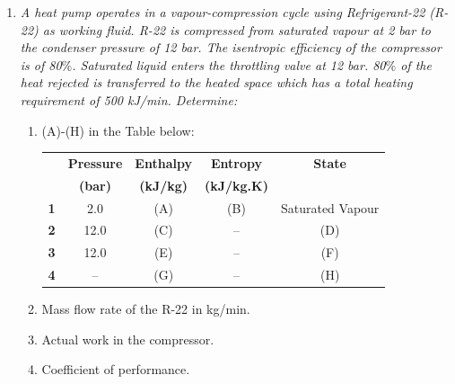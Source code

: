 \begin{enumerate}
\item \label{Ex10} {\it A heat pump operates in a vapour-compression cycle using Refrigerant-22 (R-22) as working fluid.  R-22 is compressed from saturated vapour at 2 bar to the condenser pressure of 12 bar.  The isentropic efficiency of the compressor is of 80$\%$. Saturated liquid enters the throttling valve at 12 bar. 80$\%$ of the heat rejected is transferred to the heated space which has a total heating requirement of 500 kJ/min. Determine:
\begin{enumerate}
\item (A)-(H) in the Table below:

\begin{center}
\begin{tabular}{ || c || c | c | c | c || }
\hline\hline
        & {\bf Pressure}  &  {\bf Enthalpy}  & {\bf Entropy}     & {\bf State}  \\
        & {\bf (bar)}     &  {\bf (kJ/kg)}   &  {\bf (kJ/kg.K)}  &              \\
\hline\hline
{\bf 1} &   2.0           &       (A)        &      (B)          &  Saturated Vapour \\
{\bf 2} &   12.0          &       (C)        &      --           &  (D)          \\
{\bf 3} &   12.0          &       (E)        &      --           &  (F)        \\
{\bf 4} &   --            &       (G)        &      --           &  (H)       \\ 
\hline\hline
\end{tabular}
\end{center}

\item Mass flow rate of the R-22 in kg/min.
\item Actual work in the compressor.
\item Coefficient of performance.

\end{enumerate}

}



\end{enumerate}
